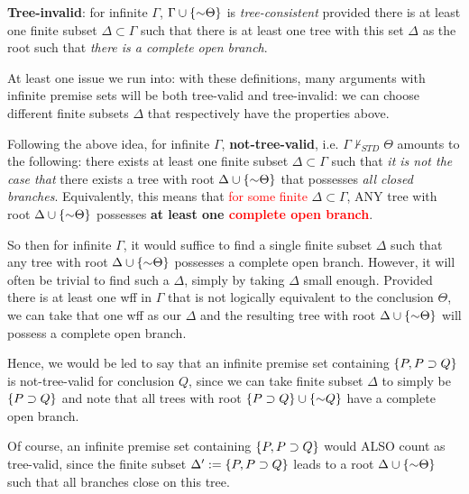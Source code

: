 \documentclass[12pt]{memoir}
\begin{document}
\begin{enumerate}[1.)]
\textbf{Tree-invalid}: for infinite $\Gamma$, $\Gamma \cup \{\enot \Theta\}$ is \emph{tree-consistent} provided there is at least one finite subset $\Delta \subset \Gamma$ such that there is at least one tree with this set $\Delta $ as the root such that \emph{there is a complete open branch}.

At least one issue we run into: with these definitions, many arguments with infinite premise sets will be both tree-valid and tree-invalid: we can choose different finite subsets $\Delta$ that respectively have the properties above. 

Following the above idea, for infinite $\Gamma$, \textbf{not-tree-valid}, i.e. $\Gamma \nvdash_{STD} \Theta$ amounts to the following: there exists at least one finite subset $\Delta \subset \Gamma$ such that \textit{it is not the case that} there exists a tree with root $\Delta \cup \{\enot \Theta \}$ that possesses \emph{all closed branches}.  Equivalently, this means that \textcolor{red}{for some finite} $\Delta \subset \Gamma$, ANY tree with root $\Delta \cup \{\enot \Theta \}$ possesses \textbf{at least one \textcolor{red}{complete open branch}}. 



So then for infinite $\Gamma$, it would suffice to find a single finite subset $\Delta$ such that any tree with root $\Delta \cup \{\enot \Theta \}$ possesses a complete open branch. However, it will often be trivial to find such a $\Delta$, simply by taking $\Delta$ small enough. Provided there is at least one wff in $\Gamma$ that is not logically equivalent to the conclusion $\Theta$, we can take that one wff as our $\Delta$ and the resulting tree with root $\Delta \cup \{\enot \Theta \}$ will possess a complete open branch. 

Hence, we would be led to say that an infinite premise set containing $\{P, P \supset Q \}$ is not-tree-valid for conclusion $Q$, since we can take finite subset $\Delta$ to simply be $\{P \supset Q\}$ and note that all trees with root $\{P \eif Q \} \cup \{\enot Q \}$ have a complete open branch. 

Of course, an infinite premise set containing $\{P, P \supset Q \}$ would ALSO count as tree-valid, since the finite subset $\Delta' := \{P, P \supset Q \}$ leads to a root $\Delta \cup \{\enot \Theta \}$ such that all branches close on this tree. 


\end{enumerate}
\end{document}
